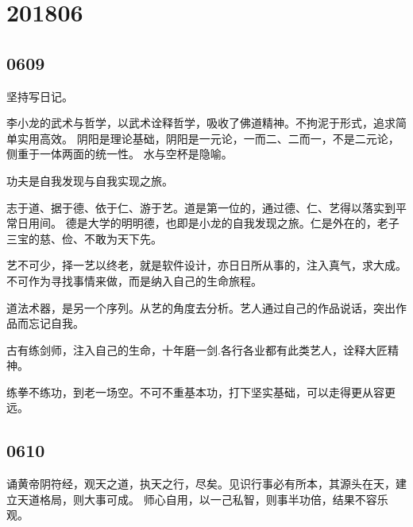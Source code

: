 \section{201806}

\subsection{0609}

坚持写日记。

李小龙的武术与哲学，以武术诠释哲学，吸收了佛道精神。不拘泥于形式，追求简单实用高效。
阴阳是理论基础，阴阳是一元论，一而二、二而一，不是二元论，侧重于一体两面的统一性。
水与空杯是隐喻。

功夫是自我发现与自我实现之旅。

志于道、据于德、依于仁、游于艺。道是第一位的，通过德、仁、艺得以落实到平常日用间。
德是大学的明明德，也即是小龙的自我发现之旅。仁是外在的，老子三宝的慈、俭、不敢为天下先。

艺不可少，择一艺以终老，就是软件设计，亦日日所从事的，注入真气，求大成。
不可作为寻找事情来做，而是纳入自己的生命旅程。

道法术器，是另一个序列。从艺的角度去分析。艺人通过自己的作品说话，突出作品而忘记自我。

古有练剑师，注入自己的生命，十年磨一剑.各行各业都有此类艺人，诠释大匠精神。

练拳不练功，到老一场空。不可不重基本功，打下坚实基础，可以走得更从容更远。

\subsection{0610}

诵黄帝阴符经，观天之道，执天之行，尽矣。见识行事必有所本，其源头在天，建立天道格局，则大事可成。
师心自用，以一己私智，则事半功倍，结果不容乐观。

